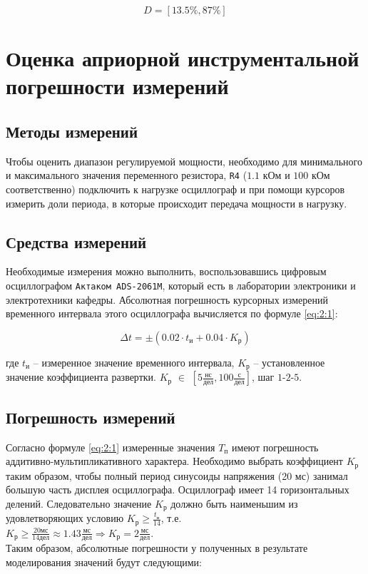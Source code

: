 \begin{displaymath}
	D = [13.5\%, 87\%]
\end{displaymath}

\section{Оценка априорной инструментальной погрешности измерений}

\subsection{Методы измерений}

Чтобы оценить диапазон регулируемой мощности, необходимо для минимального и максимального значения переменного резистора, \verb+R4+ ($1.1$ кОм и $100$ кОм соответственно) подключить к нагрузке осциллограф и при помощи курсоров измерить доли периода, в которые происходит передача мощности в нагрузку.

\subsection{Средства измерений}

Необходимые измерения можно выполнить, воспользовавшись цифровым осциллографом \verb+Актаком ADS-2061M+, который есть в лаборатории электроники и электротехники кафедры. Абсолютная погрешность курсорных измерений временного интервала этого осциллографа вычисляется по формуле \ref{eq:2:1}:

\begin{equation}
\label{eq:2:1}
	\Delta t = \pm \left(0.02 \cdot t_{\text{и}} + 0.04 \cdot K_{\text{р}} \right)
\end{equation}

\noindent где $t_{\text{и}}$ -- измеренное значение временного интервала, $K_{\text{р}}$ -- установленное значение коэффициента развертки. $K_{\text{р}}$ $\in$ $\left[5 \frac{\text{нс}}{\text{дел}} , 100 \frac{\text{с}}{\text{дел}}\right]$, шаг $1$-$2$-$5$.

\subsection{Погрешность измерений}

Согласно формуле \ref{eq:2:1} измеренные значения $T_{\text{п}}$ имеют погрешность\\\noindent аддитивно-мультипликативного характера. Необходимо выбрать коэффициент $K_{\text{р}}$ таким образом, чтобы полный период синусоиды напряжения (20 мс) занимал большую часть дисплея осциллографа. Осциллограф имеет 14 горизонтальных делений. Следовательно значение $K_{\text{р}}$ должно быть наименьшим из удовлетворяющих условию $K_{\text{р}} \geq \frac{t_{\text{и}}}{14}$, т.е.\\\noindent $K_{\text{р}} \geq \frac{20 \text{мс}}{14 \text{дел}} \approx 1.43 \frac{\text{мс}}{\text{дел}} \Rightarrow K_{\text{р}} = 2 \frac{\text{мс}}{\text{дел}}$.\\\noindent Таким образом, абсолютные погрешности у полученных в результате моделирования значений будут следующими:

